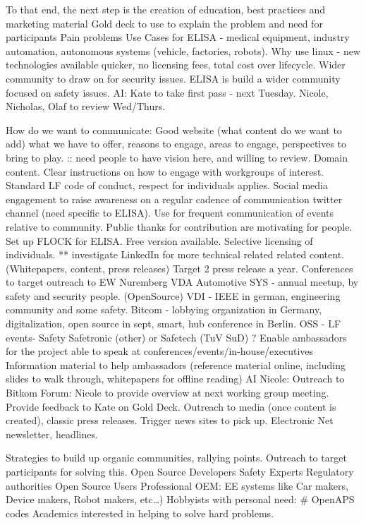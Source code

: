\documentclass[12pt]{ElisaPaper}
\begin{document}
To that end, the next step is the creation of education, best practices and marketing material
Gold deck to use to explain the problem and need for participants
Pain problems
Use Cases for ELISA - medical equipment, industry automation,  autonomous systems (vehicle, factories, robots).   
Why use linux - new technologies available quicker,  no licensing fees, total cost over lifecycle.
Wider community to draw on for security issues.
ELISA is build a wider community focused on safety issues.
AI:  Kate to take first pass - next Tuesday.
Nicole, Nicholas, Olaf to review Wed/Thurs.  

How do we want to communicate:
Good website (what content do we want to add)
what we have to offer,  reasons to engage, areas to engage,  perspectives to bring to play. :: need people to have vision here, and willing to review.
Domain content.
Clear instructions on how to engage with workgroups of interest.
Standard LF code of conduct,  respect for individuals applies.
Social media engagement to raise awareness 
on a regular cadence of communication twitter channel (need specific to ELISA).
Use for frequent communication of events relative to community.
Public thanks for contribution are motivating for people.   
Set up FLOCK for ELISA.
Free version available.
Selective licensing of individuals.
** investigate
LinkedIn for more technical related related content.
(Whitepapers, content, press releases)
Target 2 press release a year.
Conferences to target outreach to 
EW Nuremberg
VDA Automotive SYS - annual meetup, by safety and security people.  (OpenSource)
VDI - IEEE in german,  engineering community and some safety.
Bitcom - lobbying organization in Germany,  digitalization,  open source in sept,  smart,  hub conference in Berlin. 
OSS - LF events- Safety
Safetronic (other) or Safetech (TuV SuD)
?
Enable ambassadors for the project able to speak at conferences/events/in-house/executives 
Information material to help ambassadors (reference material online, including slides to walk through, whitepapers for offline reading)
AI Nicole: Outreach to Bitkom Forum:  Nicole to provide overview at next working group meeting.
Provide feedback to Kate on Gold Deck.
Outreach to media (once content is created),  classic press releases.
Trigger news sites to pick up.
Electronic Net newsletter,  headlines.


Strategies to build up organic communities,  rallying points.
Outreach to target participants for solving this.
Open Source Developers 
Safety Experts
Regulatory authorities
Open Source Users 
Professional OEM:  EE systems like  Car makers, Device makers, Robot makers, etc…)
Hobbyists with personal need:  \# OpenAPS codes
Academics interested in helping to solve hard problems.
\end{document}
